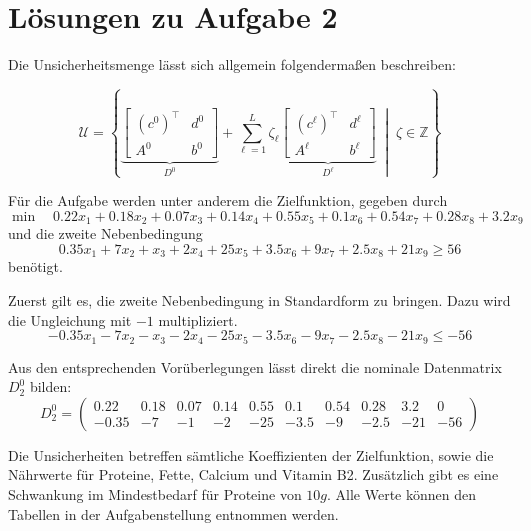 \documentclass[a4paper,12pt]{article}
\begin{document}
\newpage

\section*{L\"osungen zu Aufgabe 2}

Die Unsicherheitsmenge l\"asst sich allgemein folgenderma\ss en beschreiben:

\[
\mathcal{U} = \left\{
\underbrace{
\left[
\begin{array}{c|c}
(c^0)^\top & d^0 \\ \hline
A^0 & b^0
\end{array}
\right]
}_{D^0}
+ \sum_{\ell=1}^L \zeta_\ell
\underbrace{
\left[
\begin{array}{c|c}
(c^\ell)^\top & d^\ell \\ \hline
A^\ell & b^\ell
\end{array}
\right]
}_{D^\ell}
\;\middle|\; \zeta \in \mathbb{Z}
\right\}
\]

F\"ur die Aufgabe werden unter anderem die Zielfunktion, gegeben durch
\[
    \min \quad 0.22x_1 + 0.18x_2 + 0.07x_3 + 0.14x_4 + 0.55x_5 + 0.1x_6 + 0.54x_7 + 0.28x_8 + 3.2x_9
\]
und die zweite Nebenbedingung 
\[
0.35x_1 + 7x_2 + x_3 + 2x_4 + 25x_5 + 3.5x_6 + 9x_7 + 2.5x_8 + 21x_9 \geq 56
\]
ben\"otigt.

Zuerst gilt es, die zweite Nebenbedingung in Standardform zu bringen. Dazu wird die Ungleichung mit $-1$ multipliziert.
\[
    -0.35x_1  -7x_2  -x_3  -2x_4 - 25x_5 - 3.5x_6 - 9x_7 - 2.5x_8 - 21x_9 \leq -56
\]

Aus den entsprechenden Vor\"uberlegungen l\"asst direkt die nominale Datenmatrix $D^0_2$ bilden:
\[
    D^0_2 = \begin{pmatrix}
        0.22 & 0.18 & 0.07 & 0.14 & 0.55 & 0.1 & 0.54 & 0.28 & 3.2 & 0 \\
        -0.35 & -7 & -1 & -2 & -25 & -3.5 & -9 & -2.5 & -21 & -56
    \end{pmatrix}
\]
        
Die Unsicherheiten betreffen s\"amtliche Koeffizienten der Zielfunktion, sowie die N\"ahrwerte f\"ur Proteine, Fette, Calcium und Vitamin B2. Zus\"atzlich gibt es eine Schwankung im Mindestbedarf f\"ur Proteine von $10g$. Alle Werte k\"onnen den Tabellen in der Aufgabenstellung entnommen werden.
\end{document}
